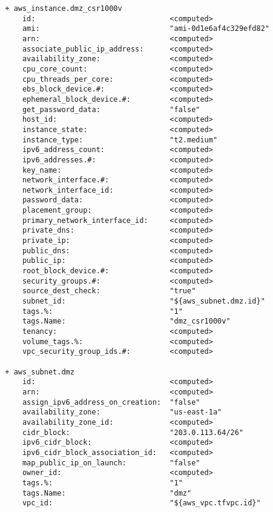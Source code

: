 \begin{verbatim}
  + aws_instance.dmz_csr1000v
      id:                               <computed>
      ami:                              "ami-0d1e6af4c329efd82"
      arn:                              <computed>
      associate_public_ip_address:      <computed>
      availability_zone:                <computed>
      cpu_core_count:                   <computed>
      cpu_threads_per_core:             <computed>
      ebs_block_device.#:               <computed>
      ephemeral_block_device.#:         <computed>
      get_password_data:                "false"
      host_id:                          <computed>
      instance_state:                   <computed>
      instance_type:                    "t2.medium"
      ipv6_address_count:               <computed>
      ipv6_addresses.#:                 <computed>
      key_name:                         <computed>
      network_interface.#:              <computed>
      network_interface_id:             <computed>
      password_data:                    <computed>
      placement_group:                  <computed>
      primary_network_interface_id:     <computed>
      private_dns:                      <computed>
      private_ip:                       <computed>
      public_dns:                       <computed>
      public_ip:                        <computed>
      root_block_device.#:              <computed>
      security_groups.#:                <computed>
      source_dest_check:                "true"
      subnet_id:                        "${aws_subnet.dmz.id}"
      tags.%:                           "1"
      tags.Name:                        "dmz_csr1000v"
      tenancy:                          <computed>
      volume_tags.%:                    <computed>
      vpc_security_group_ids.#:         <computed>

  + aws_subnet.dmz
      id:                               <computed>
      arn:                              <computed>
      assign_ipv6_address_on_creation:  "false"
      availability_zone:                "us-east-1a"
      availability_zone_id:             <computed>
      cidr_block:                       "203.0.113.64/26"
      ipv6_cidr_block:                  <computed>
      ipv6_cidr_block_association_id:   <computed>
      map_public_ip_on_launch:          "false"
      owner_id:                         <computed>
      tags.%:                           "1"
      tags.Name:                        "dmz"
      vpc_id:                           "${aws_vpc.tfvpc.id}"


\end{verbatim}
